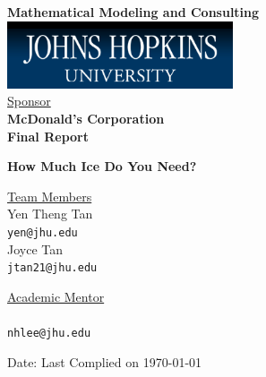 \documentclass[oneside,12pt]{report}
\begin{document}
\def\thefootnote{\fnsymbol{footnote}}

\thispagestyle{empty}

\def\shiftdowna{0.32in}  %
\def\shiftdownb{0.22in}  %


\begin{center}
\textbf{{\large Mathematical Modeling and Consulting }}\\

\vspace \shiftdowna
\includegraphics[width=0.5\textwidth]{jhu.png}\\

\vspace \shiftdowna
\underline {Sponsor}\\ 
\vspace{5pt}
\textbf{\large McDonald's Corporation} \\
\vspace\shiftdowna
\textbf{{Final Report}}

\vspace \shiftdowna
\textbf{{\Large How Much Ice Do You Need?}}

\vspace{0.35in}
\underline {Team Members}\\
\vspace{5pt}
Yen Theng Tan \\
\texttt{yen@jhu.edu} \\
\vspace{10pt}
Joyce Tan \\
\texttt{jtan21@jhu.edu}

\vspace \shiftdownb
\underline {Academic Mentor} \\
\vspace{5pt}
\\
\texttt{nhlee@jhu.edu}


\vspace \shiftdowna
Date: Last Complied on \today

\end{center}
\end{document}
